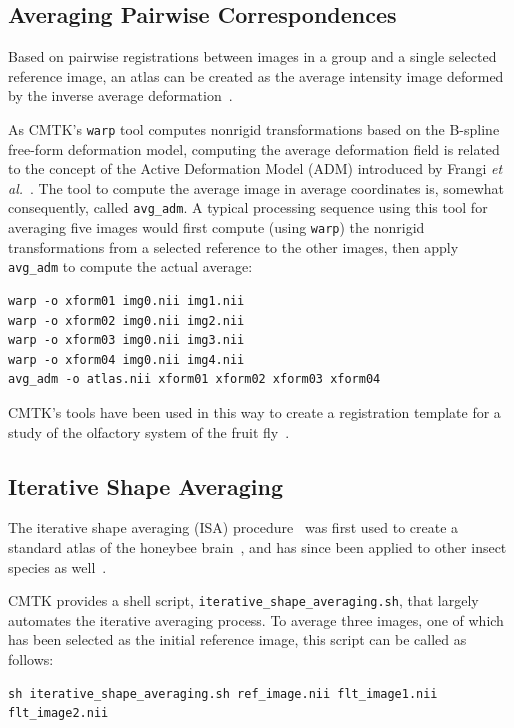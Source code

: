 \documentclass{InsightArticle}
\begin{document}
\subsection{Averaging Pairwise Correspondences}

Based on pairwise registrations between images in a group and a single selected
reference image, an atlas can be created as the average intensity image
deformed by the inverse average deformation~\cite{GuimMeunThir:2000}.

As CMTK's {\tt warp} tool computes nonrigid transformations based on the
B-spline free-form deformation model, computing the average deformation field
is related to the concept of the Active Deformation Model (ADM) introduced by
Frangi {\em et al.\/}~\cite{FranRuecSchn:2001,FranRuecSchn:2002}. The tool to
compute the average image in average coordinates is, somewhat consequently,
called {\tt avg\_adm}. A typical processing sequence using this tool for
averaging five images would first compute (using {\tt warp}) the nonrigid
transformations from a selected reference to the other images, then apply {\tt
avg\_adm} to compute the actual average:
\begin{verbatim}
warp -o xform01 img0.nii img1.nii
warp -o xform02 img0.nii img2.nii
warp -o xform03 img0.nii img3.nii
warp -o xform04 img0.nii img4.nii
avg_adm -o atlas.nii xform01 xform02 xform03 xform04
\end{verbatim}

CMTK's tools have been used in this way to create a registration template for
a study of the olfactory system of the fruit fly~\cite{JeffPottChan:2007}.

\subsection{Iterative Shape Averaging}

The iterative shape averaging (ISA) procedure~\cite{RohlBranMaur:2001} was
first used to create a standard atlas of the honeybee
brain~\cite{BranRohlRyba:2005}, and has since been applied to other insect
species as well~\cite{KuryRohlKrof:2008,KvelLofaRyba:2009}.

CMTK provides a shell script, {\tt iterative\_shape\_averaging.sh}, that
largely automates the iterative averaging process. To average three images,
one of which has been selected as the initial reference image, this script can
be called as follows:
\begin{verbatim}
sh iterative_shape_averaging.sh ref_image.nii flt_image1.nii flt_image2.nii
\end{verbatim}
\end{document}
